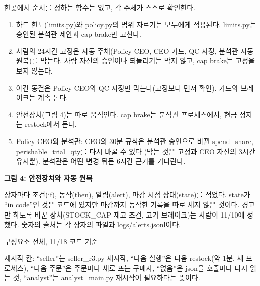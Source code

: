 \documentclass[10pt]{article}
\newcommand{\kpage}[2]{\noindent{\hangulfont\LARGE\bfseries\color{own}#1}\hfill{\hangulfont\small\color{kit}#2}\par
  \vspace{1mm}{\color{own}\rule{\linewidth}{1.2pt}}\par\vspace{3mm}}
\newcommand{\ksec}[2][own]{\par\needspace{8\baselineskip}\vspace{3mm}\noindent\colorbox{#1}{\parbox{\dimexpr\linewidth-2\fboxsep}{\color{white}\bfseries\large #2}}\par\vspace{2mm}}
\begin{document}
\begin{kbox}[title=충돌 우선순위 (코드 기준)]
 한곳에서 순서를 정하는 함수는 없고, 각 주체가 스스로 확인한다.
\begin{enumerate}
  \item 하드 한도(limits.py)와 policy.py의 범위 자르기는 모두에게 적용된다. limits.py는 승인된 분석관 제안과 cap brake만 고친다.
  \item 사람의 24시간 고정은 자동 주체(Policy CEO, CEO 가드, QC 자정, 분석관 자동 원복)를 막는다. 사람 자신의 승인이나
        되돌리기는 막지 않고, cap brake는 고정을 보지 않는다.
  \item 야간 동결은 Policy CEO와 QC 자정만 막는다(고정보다 먼저 확인). 가드와 브레이크는 계속 돈다.
  \item 안전장치(그림 4)는 따로 움직인다. cap brake는 분석관 프로세스에서, 현금 정지는 restock에서 돈다.
  \item Policy CEO와 분석관: CEO의 30분 규칙은 분석관 승인으로 바뀐 spend\_share, perishable\_trial\_qty를 다시 바꿀 수 있다
        (막는 것은 고정과 CEO 자신의 3시간 유지뿐). 분석관은 어떤 변경 뒤든 6시간 근거를 기다린다.
\end{enumerate}
\end{kbox}

\ksec{그림 4: 안전장치와 자동 원복}
상자마다 조건(if), 동작(then), 알림(alert), 마감 시점 상태(state)를 적었다. state가 “in code”인 것은 코드에 있지만
마감까지 동작한 기록을 따로 세지 않은 것이다. 경고만 하도록 바꾼 장치(STOCK\_CAP 재고 조건, 고가 브레이크)는 사람이
11/10에 정했다. 숫자의 출처는 각 상자의 파일과 logs/alerts.jsonl이다.

\newpage
\kpage{Components}{구성요소 전체, 11/18 코드 기준}
재시작 칸: “seller”는 seller\_r3.py 재시작, “다음 실행”은 다음 restock(약 1분, 새 프로세스), “다음 주문”은 주문마다 새로
뜨는 구매자, “없음”은 json을 호출마다 다시 읽는 것, “analyst”는 analyst\_main.py 재시작이 필요하다는 뜻이다.
\end{document}
